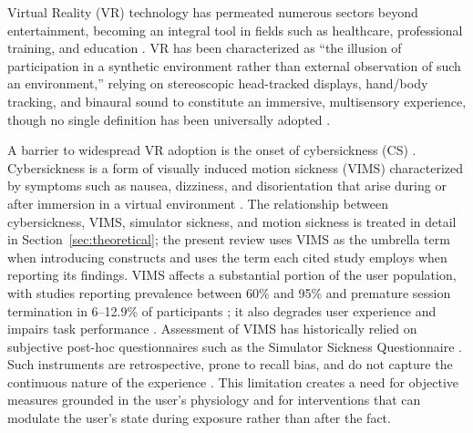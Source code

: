 Virtual Reality (VR) technology has permeated numerous sectors beyond entertainment, becoming an integral tool in fields such as healthcare, professional training, and education \cite{chatainGraspingDerivativesTeaching2022}.
VR has been characterized as ``the illusion of participation in a synthetic environment rather than external observation of such an environment,''\cite{gigante1VirtualReality1993} relying on stereoscopic head-tracked displays, hand/body tracking, and binaural sound to constitute an immersive, multisensory experience, though no single definition has been universally adopted \cite{kardong-edgrenCallUnifyDefinitions2019}.

A barrier to widespread VR adoption is the onset of cybersickness (CS) \cite{casermanCybersicknessCurrentgenerationVirtual2021}.
Cybersickness is a form of visually induced motion sickness (VIMS) \cite{weechPresenceCybersicknessVirtual2019} characterized by symptoms such as nausea, dizziness, and disorientation that arise during or after immersion in a virtual environment \cite{casermanCybersicknessCurrentgenerationVirtual2021}.
The relationship between cybersickness, VIMS, simulator sickness, and motion sickness is treated in detail in Section~\ref{sec:theoretical}; the present review uses VIMS as the umbrella term when introducing constructs and uses the term each cited study employs when reporting its findings.
VIMS affects a substantial portion of the user population, with studies reporting prevalence between 60\% and 95\% and premature session termination in 6--12.9\% of participants \cite{casermanCybersicknessCurrentgenerationVirtual2021}; it also degrades user experience and impairs task performance \cite{mimnaughVirtualRealitySickness2023}.
Assessment of VIMS has historically relied on subjective post-hoc questionnaires such as the Simulator Sickness Questionnaire \cite{kennedySimulatorSicknessQuestionnaire1993}.
Such instruments are retrospective, prone to recall bias, and do not capture the continuous nature of the experience \cite{changBrainActivityCybersickness2023, dennisonImprovingMotionSickness2019}.
This limitation creates a need for objective measures grounded in the user's physiology and for interventions that can modulate the user's state during exposure rather than after the fact.

